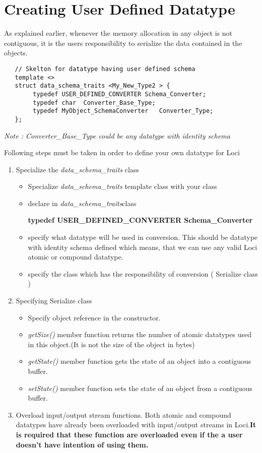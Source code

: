 \section{Creating User Defined Datatype}
\par As explained earlier, whenever the memory allocation in any object is
not contiguous, it is the users responsibility to serialize the
data contained in the objects. 
\begin{verbatim}
   // Skelton for datatype having user defined schema
   template <>
   struct data_schema_traits <My_New_Type2 > {
        typedef USER_DEFINED_CONVERTER Schema_Converter;
        typedef char  Converter_Base_Type;
        typedef MyObject_SchemaConverter   Converter_Type;
   };
\end{verbatim}
\par {\em Note : Converter\_Base\_Type could be any datatype with identity schema}
\par Following steps must be taken in order to define your own datatype
for Loci
\begin{enumerate} 
\item Specialize the {\em data\_schema\_traits} class
\begin{itemize}
\item Specialize {\em data\_schema\_traits} template class with your
class
\item \par declare in {\em data\_schema\_traits}class
\begin{center}
{\bf typedef USER\_DEFINED\_CONVERTER Schema\_Converter}
\end{center}
\item specify what datatype will be used in conversion. This should be 
datatype with identity schema defined which means, that we can use any 
valid Loci atomic or compound datatype.
\item specify the class which has the responsibility of conversion (
Serialize class )
\end{itemize}
\item Specifying Serialize class
\begin{itemize}
\item Specify object reference in the constructor.
\item {\em getSize()} member function returns the number of
atomic datatypes used in this object.(It is not the size of the object in bytes)
\item {\em getState()} member function gets the state of an
object into a contiguous buffer.
\item {\em setState()} member function sets the state of an
object from a contiguous buffer.
\end{itemize}
\item Overload input/output stream functions.
Both atomic and compound datatypes have already been overloaded with
input/output streams in Loci.{\bf It is required that these function 
are overloaded even if the a user doesn't have intention of
using them.}
\end{enumerate}
